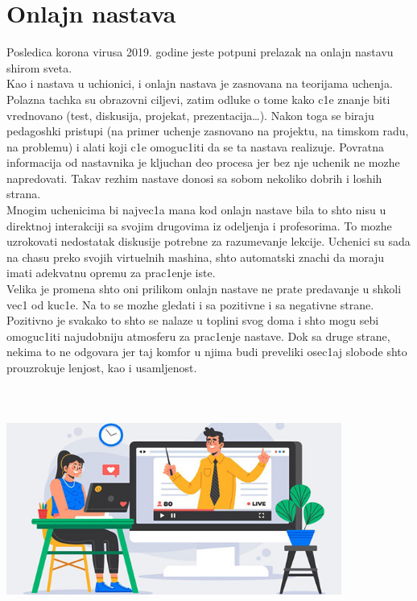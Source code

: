 \documentclass[12pt,twoside]{article}
\begin{document}
\section{Onlajn nastava}
Posledica korona virusa 2019. godine jeste potpuni prelazak na onlajn nastavu shirom sveta.\\
Kao i nastava u uchionici, i onlajn nastava je zasnovana na teorijama uchenja. Polazna tachka su obrazovni ciljevi, zatim odluke o tome kako c1e znanje biti vrednovano (test, diskusija, projekat, prezentacija…). Nakon toga se biraju pedagoshki pristupi (na primer uchenje zasnovano na projektu, na timskom radu, na problemu) i alati koji c1e omoguc1iti da se ta nastava realizuje. Povratna informacija od nastavnika je kljuchan deo procesa jer bez nje uchenik ne mozhe napredovati.
 Takav rezhim nastave donosi sa sobom nekoliko dobrih i loshih strana. \\
Mnogim uchenicima bi najvec1a mana kod onlajn nastave bila to shto nisu u direktnoj interakciji sa svojim drugovima iz odeljenja i profesorima. To mozhe uzrokovati nedostatak diskusije potrebne za razumevanje lekcije. Uchenici su sada na chasu preko svojih virtuelnih mashina, shto automatski znachi da moraju imati adekvatnu opremu za prac1enje iste. \\
Velika je promena shto oni prilikom onlajn nastave ne prate predavanje u shkoli vec1 od kuc1e. Na to se mozhe gledati i sa pozitivne i sa negativne strane. Pozitivno je svakako to shto se nalaze u toplini svog doma i shto mogu sebi omoguc1iti najudobniju atmosferu za prac1enje nastave. Dok sa druge strane, nekima to ne odgovara jer taj komfor u njima budi preveliki osec1aj slobode shto prouzrokuje lenjost, kao i usamljenost.
\begin{center}
\includegraphics[width=11cm, height=8cm]{online-kurs-jezika.jpg}
\end{center}
\end{document}
